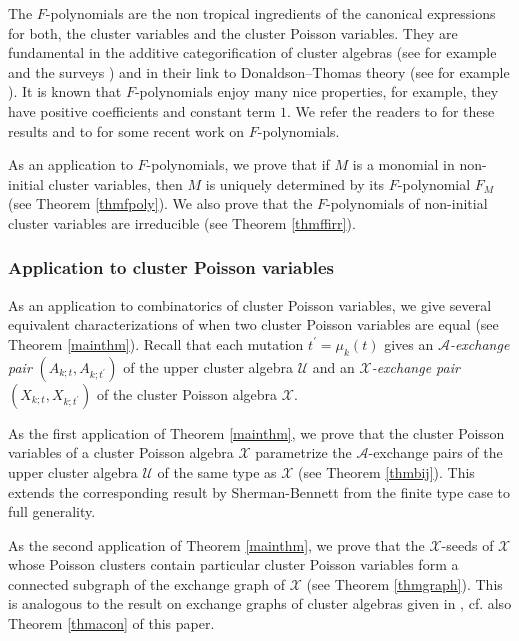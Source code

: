 \documentclass{amsart}
\theoremstyle{definition}
\theoremstyle{remark}
\numberwithin{equation}{section}
\begin{document}
The $F$-polynomials
are the non tropical ingredients of the canonical expressions
\cite{NZ} for
both, the cluster variables and the cluster Poisson variables.
 They are fundamental in the additive categorification of cluster
algebras (see for example
\cite{CalderoChapoton06,DWZ} and the surveys \cite{BuanMarsh06,
GeissLeclercSchroeer08a,Keller10b, Keller12a, Plamondon18})
and in their link to Donaldson--Thomas theory
(see for example \cite{KontsevichSoibelman08,N,Bridgeland17}). It is known that $F$-polynomials enjoy many nice properties, for example, they have positive coefficients and constant term $1$. We refer the readers to \cite{LeeSchiffler15,DWZ,GHKK} for these results and to \cite{GyodaYurikusa19,Gyoda19,FG,Fei19a,Fei19b,li-pan-2022} for some recent work on $F$-polynomials.

As an application to $F$-polynomials, we prove that  if $M$ is a monomial in non-initial cluster variables, then $M$ is uniquely determined by its $F$-polynomial $F_M$ (see Theorem \ref{thmfpoly}).  We also prove that the $F$-polynomials of non-initial cluster variables are irreducible (see Theorem \ref{thmffirr}).



\subsubsection*{Application to cluster Poisson variables}
  As an application to combinatorics of cluster Poisson variables, we give  several equivalent characterizations of when two cluster Poisson variables are equal (see Theorem \ref{mainthm}). Recall that each mutation $t^\prime=\mu_k(t)$ gives an {\em $\mathscr A$-exchange pair} $(A_{k;t},A_{k;t^\prime})$ of the upper cluster algebra $\mathcal U$ and  an {\em $\mathscr X$-exchange pair} $(X_{k;t},X_{k;t^\prime})$ of the cluster Poisson algebra $\mathcal X$.

 As the first application of Theorem \ref{mainthm}, we prove that
 the cluster Poisson variables of a cluster Poisson algebra $\mathcal X$ parametrize the $\mathscr A$-exchange pairs of the upper cluster algebra $\mathcal U$ of the same type as $\mathcal X$ (see Theorem \ref{thmbij}). This extends the corresponding result by  Sherman-Bennett \cite{S} from the finite type case to full generality.

 As the second application of Theorem \ref{mainthm}, we prove that the $\mathscr X$-seeds of  $\mathcal X$ whose Poisson clusters contain particular cluster Poisson variables form a connected subgraph of the exchange graph of  $\mathcal X$ (see Theorem \ref{thmgraph}). This is analogous to the result on exchange graphs of cluster algebras given in \cite{CL1}, cf. also Theorem \ref{thmacon} of this paper.
\end{document}

